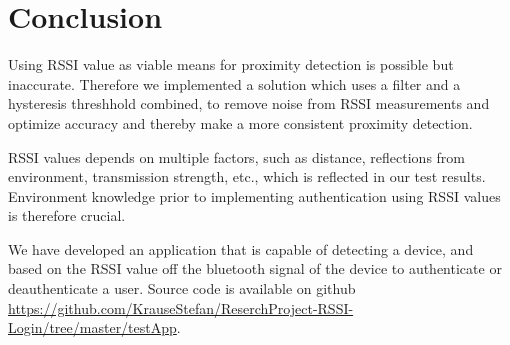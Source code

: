 \section{Conclusion}
Using RSSI value as viable means for proximity detection is possible but inaccurate. Therefore we implemented a solution which uses a filter and a hysteresis threshhold combined, to remove noise from RSSI measurements and optimize accuracy and thereby make a more consistent proximity detection.

RSSI values depends on multiple factors, such as distance, reflections from environment, transmission strength, etc., which is reflected in our test results. Environment knowledge prior to implementing authentication using RSSI values is therefore crucial.

We have developed an application that is capable of detecting a device, and based on the RSSI value off the bluetooth signal of the device to authenticate or deauthenticate a user. Source code is available on github \url{https://github.com/KrauseStefan/ReserchProject-RSSI-Login/tree/master/testApp}.

%

